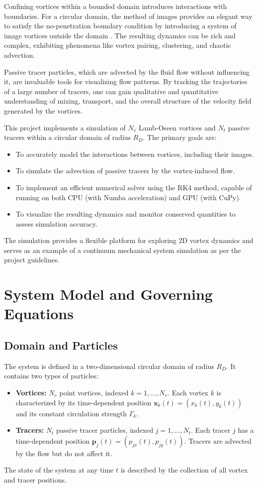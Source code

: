 \documentclass[12pt,letterpaper]{article}
\newcommand{\pos}{\bm{x}}
\newcommand{\tracerpos}{\bm{p}}
\newcommand{\vortstrength}{\Gamma}
\newcommand{\domainradius}{R_D}
\begin{document}
Confining vortices within a bounded domain introduces interactions with boundaries. For a circular domain, the method of images provides an elegant way to satisfy the no-penetration boundary condition by introducing a system of image vortices outside the domain \cite{MilneThomson1968}. The resulting dynamics can be rich and complex, exhibiting phenomena like vortex pairing, clustering, and chaotic advection.

Passive tracer particles, which are advected by the fluid flow without influencing it, are invaluable tools for visualizing flow patterns. By tracking the trajectories of a large number of tracers, one can gain qualitative and quantitative understanding of mixing, transport, and the overall structure of the velocity field generated by the vortices.

This project implements a simulation of $N_v$ Lamb-Oseen vortices and $N_t$ passive tracers within a circular domain of radius $\domainradius$. The primary goals are:
\begin{itemize}[nosep]
    \item To accurately model the interactions between vortices, including their images.
    \item To simulate the advection of passive tracers by the vortex-induced flow.
    \item To implement an efficient numerical solver using the RK4 method, capable of running on both CPU (with Numba acceleration) and GPU (with CuPy).
    \item To visualize the resulting dynamics and monitor conserved quantities to assess simulation accuracy.
\end{itemize}
The simulation provides a flexible platform for exploring 2D vortex dynamics and serves as an example of a continuum mechanical system simulation as per the project guidelines.

\section{System Model and Governing Equations}
\subsection{Domain and Particles}
The system is defined in a two-dimensional circular domain of radius $\domainradius$. It contains two types of particles:
\begin{itemize}
    \item \textbf{Vortices:} $N_v$ point vortices, indexed $k=1, \dots, N_v$. Each vortex $k$ is characterized by its time-dependent position $\pos_k(t) = (x_k(t), y_k(t))$ and its constant circulation strength $\vortstrength_k$.
    \item \textbf{Tracers:} $N_t$ passive tracer particles, indexed $j=1, \dots, N_t$. Each tracer $j$ has a time-dependent position $\tracerpos_j(t) = (p_{jx}(t), p_{jy}(t))$. Tracers are advected by the flow but do not affect it.
\end{itemize}
The state of the system at any time $t$ is described by the collection of all vortex and tracer positions.
\end{document}
